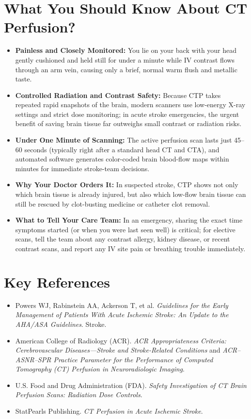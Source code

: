 \section{What You Should Know About CT Perfusion?}
\begin{itemize}
    \item \textbf{Painless and Closely Monitored:} You lie on your back with your head gently cushioned and held still for under a minute while IV contrast flows through an arm vein, causing only a brief, normal warm flush and metallic taste.
    \item \textbf{Controlled Radiation and Contrast Safety:} Because CTP takes repeated rapid snapshots of the brain, modern scanners use low-energy X-ray settings and strict dose monitoring; in acute stroke emergencies, the urgent benefit of saving brain tissue far outweighs small contrast or radiation risks.
    \item \textbf{Under One Minute of Scanning:} The active perfusion scan lasts just 45--60 seconds (typically right after a standard head CT and CTA), and automated software generates color-coded brain blood-flow maps within minutes for immediate stroke-team decisions.
    \item \textbf{Why Your Doctor Orders It:} In suspected stroke, CTP shows not only which brain tissue is already injured, but also which low-flow brain tissue can still be rescued by clot-busting medicine or catheter clot removal.
    \item \textbf{What to Tell Your Care Team:} In an emergency, sharing the exact time symptoms started (or when you were last seen well) is critical; for elective scans, tell the team about any contrast allergy, kidney disease, or recent contrast scans, and report any IV site pain or breathing trouble immediately.
\end{itemize}

\section{Key References}
\begin{itemize}
    \item Powers WJ, Rabinstein AA, Ackerson T, et al. \textit{Guidelines for the Early Management of Patients With Acute Ischemic Stroke: An Update to the AHA/ASA Guidelines}. Stroke.
    \item American College of Radiology (ACR). \textit{ACR Appropriateness Criteria: Cerebrovascular Diseases---Stroke and Stroke-Related Conditions} and \textit{ACR--ASNR--SPR Practice Parameter for the Performance of Computed Tomography (CT) Perfusion in Neuroradiologic Imaging}.
    \item U.S. Food and Drug Administration (FDA). \textit{Safety Investigation of CT Brain Perfusion Scans: Radiation Dose Controls}.
    \item StatPearls Publishing. \textit{CT Perfusion in Acute Ischemic Stroke}.
\end{itemize}

